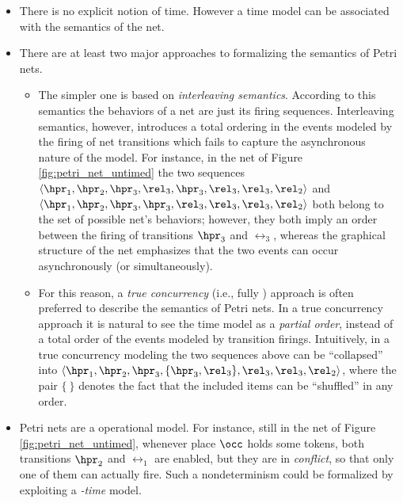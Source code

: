 \begin{itemize}
\item There is no explicit notion of time. However a time model can 
be  associated with the semantics of the net.

\item There are at least two major approaches to formalizing 
the semantics of Petri nets. 
  \begin{itemize}
  \item The simpler one is based on \emph{interleaving semantics}. According 
	 to this semantics the behaviors of a net are just its firing 
	 sequences. Interleaving semantics, however, introduces a total 
	 ordering in the events modeled by the firing of net transitions 
	 which fails to capture the asynchronous nature of the model. 
	 For instance, in the net of Figure \ref{fig:petri_net_untimed} the two sequences
	 $\langle \hpr_1, \hpr_2, \hpr_3, \rel_3, \hpr_3, \rel_3, \rel_3, \rel_2 \rangle$ and
	 $\langle \hpr_1, \hpr_2, \hpr_3, \hpr_3, \rel_3, \rel_3, \rel_3, \rel_2 \rangle$
	 both belong to the set of possible net's behaviors; however, 
	 they both imply an order between the firing of transitions $\hpr_3$ and $\rel_3$, 
	 whereas the graphical structure of the net emphasizes that the 
	 two events can occur asynchronously (or simultaneously).

  \item For this reason, a \emph{true concurrency} (i.e., fully ) 
	 approach is often preferred to describe the semantics of Petri 
	 nets. In a true concurrency approach it is natural to see the 
	 time model as a \emph{partial order}, instead of a total order of 
	 the events modeled by transition firings. Intuitively, in a true 
	 concurrency modeling the two sequences above can be ``collapsed'' into
	 $\langle \hpr_1, \hpr_2, \hpr_3, \{ \hpr_3, \rel_3 \}, \rel_3, \rel_3, \linebreak \rel_2 \rangle$,
	 where the pair $\{\ \}$ denotes the fact that the included items can 
	 be ``shuffled'' in any order.
  \end{itemize}

\item Petri nets are a  operational model. For instance, 
still in the net of Figure \ref{fig:petri_net_untimed}, whenever place $\occ$ holds 
some tokens, both transitions $\hpr_2$ and $\rel_1$ are enabled, but they are 
in \emph{conflict}, so that only one of them can actually fire. 
Such a nondeterminism could be formalized by exploiting a \emph{-time} model.


\end{itemize}
